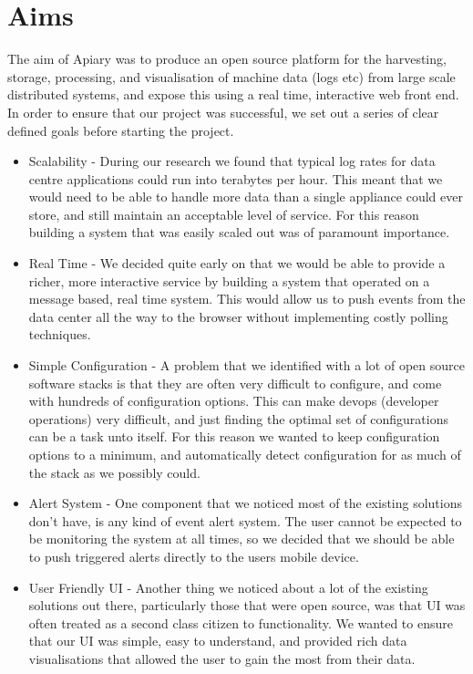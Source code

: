 \section{Aims}

The aim of Apiary was to produce an open source platform for the harvesting,
storage, processing, and visualisation of machine data (logs etc) from large
scale distributed systems, and expose this using a real time, interactive web
front end. In order to ensure that our project was successful, we set out a
series of clear defined goals before starting the project.

\begin{itemize}

\item Scalability - During our research we found that typical log rates for data
centre applications could run into terabytes per hour. This meant that we
would need to be able to handle more data than a single appliance could ever
store, and still maintain an acceptable level of service. For this reason
building a system that was easily scaled out was of paramount importance.

\item Real Time - We decided quite early on that we would be able to provide a
richer, more interactive service by building a system that operated on a
message based, real time system. This would allow us to push events from the
data center all the way to the browser without implementing costly polling
techniques.

\item Simple Configuration - A problem that we identified with a lot of open
source software stacks is that they are often very difficult to configure, and
come with hundreds of configuration options. This can make devops (developer
operations) very difficult, and just finding the optimal set of configurations
can be a task unto itself. For this reason we wanted to keep configuration
options to a minimum, and automatically detect configuration for as much of
the stack as we possibly could.

\item Alert System - One component that we noticed most of the existing
solutions don't have, is any kind of event alert system. The user cannot be
expected to be monitoring the system at all times, so we decided that we
should be able to push triggered alerts directly to the users mobile device.

\item User Friendly UI - Another thing we noticed about a lot of the existing
solutions out there, particularly those that were open source, was that UI was
often treated as a second class citizen to functionality. We wanted to ensure
that our UI was simple, easy to understand, and provided rich data
visualisations that allowed the user to gain the most from their data.


\end{itemize}
